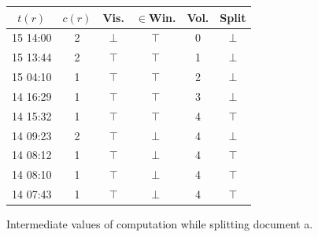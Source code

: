 \documentclass[abstracton,12pt]{scrreprt}
\begin{document}
\begin{figure}
\begin{multicols}{2}
        \begin{center}
            \begin{footnotesize}
                \begin{tabular}{|c|c|c|c|c|c|} 
                    \hline
                    $t(r)$ &    $c(r)$ &        Vis. &      $\in$Win. &         Vol. &      Split \\
                    \hline
                    15 14:00 &  2 &             $\bot$ &         $\top$ &                 0 &                 $\bot$ \\ 
                    \hline
                    15 13:44 &  2 &             $\top$ &         $\top$ &                 1 &                 $\bot$ \\
                    \hline
                    15 04:10 &  1 &             $\top$ &         $\top$ &                 2 &                 $\bot$ \\
                    \hline
                    14 16:29 &  1 &             $\top$ &         $\top$ &                 3 &                 $\bot$ \\
                    \hline
                    14 15:32 &  1 &             $\top$ &         $\top$ &                 4 &                 $\top$ \\
                    \hline
                    14 09:23 &  2 &             $\top$ &         $\bot$ &                 4 &                 $\bot$ \\
                    \hline
                    14 08:12 &  1 &             $\top$ &         $\bot$ &                 4 &                 $\top$ \\
                    \hline
                    14 08:10 &  1 &             $\top$ &         $\bot$ &                 4 &                 $\top$ \\
                    \hline
                    14 07:43 &  1 &             $\top$ &         $\bot$ &                 4 &                 $\top$ \\
                    \hline
                \end{tabular}
            \end{footnotesize}
        \end{center}
    \end{multicols}
    Intermediate values of computation while splitting document a.


\end{figure}
\end{document}
